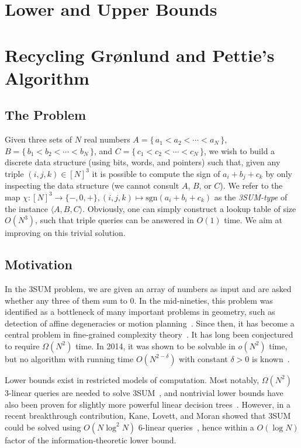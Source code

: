 \chapter{Lower and Upper Bounds}

\chapter{Recycling Gr\o nlund and Pettie's Algorithm}

\section{The Problem}

Given three sets of \(N\) real numbers
\(A = \{\, a_1 < a_2 < \cdots < a_N\,\} \),
\(B = \{\, b_1 < b_2 < \cdots < b_N\,\} \),
and \(C = \{\, c_1 < c_2 < \cdots < c_N\,\}\),
we wish to build a discrete data structure (using bits, words, and pointers) such that,
given any triple \((i,j,k) \in {[N]}^3\) it is possible to compute the sign of
\(a_i + b_j + c_k\) by only inspecting the data structure (we cannot consult
\(A\), \(B\), or \(C\)).
We refer to the map $\chi : {[N]}^3\to \{-,0,+\}, (i,j,k)\mapsto\mathrm{sgn}
(a_i+b_i+c_k)$ as the {\em 3SUM-type} of the instance $\langle A,B,C \rangle$.
Obviously, one can simply construct a lookup table of size \(O(N^3)\), such
that triple queries can be answered in \(O(1)\) time. We aim at improving on
this trivial solution.

\section{Motivation}

In the 3SUM problem, we are given an array of numbers as input and are asked
whether any three of them sum to 0. In the mid-nineties, this problem was
identified as a bottleneck of many
important problems in geometry, such as detection of affine degeneracies or
motion planning~\cite{GO95}. Since then, it has become a central problem in
fine-grained complexity theory~\cite{PW10}. It has long been conjectured to
require $\Omega (N^2)$ time. In 2014, it was shown to be solvable in $o(N^2)$
time, but no algorithm with running time $O(N^{2-\delta})$ with constant
$\delta>0$ is known~\cite{GP18}.

Lower bounds exist in restricted models of computation. Most notably,
$\Omega(N^2)$ 3-linear queries are needed to solve 3SUM~\cite{Er99},
and nontrivial lower bounds have also been proven for slightly more powerful linear
decision trees~\cite{AC05}. However, in a recent breakthrough contribution, Kane, Lovett,
and Moran showed that 3SUM could be solved using $O(N\log^2 N)$
6-linear queries~\cite{KLM18}, hence within a $O(\log N)$ factor of the
information-theoretic lower bound.

